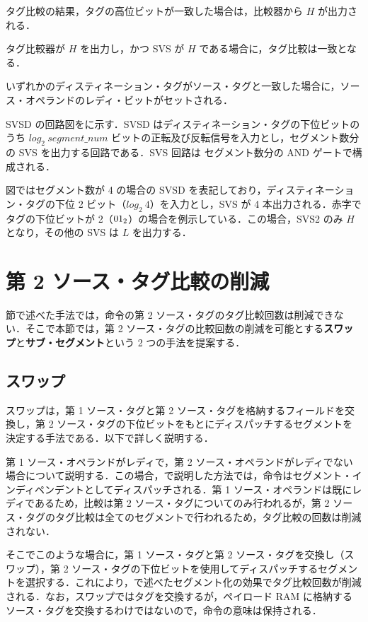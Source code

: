 タグ比較の結果，タグの高位ビットが一致した場合は，比較器から $H$ が出力される．

タグ比較器が $H$ を出力し，かつ SVS が $H$ である場合に，タグ比較は一致となる．

いずれかのディスティネーション・タグがソース・タグと一致した場合に，ソース・オペランドのレディ・ビットがセットされる．

SVSD の回路図をに示す．SVSD はディスティネーション・タグの下位ビットのうち $log_2\:segment\_num $ ビットの正転及び反転信号を入力とし，セグメント数分の SVS を出力する回路である．SVS 回路は セグメント数分の AND ゲートで構成される．

図ではセグメント数が 4 の場合の SVSD を表記しており，ディスティネーション・タグの下位 2 ビット（$log_2\:4$）を入力とし，SVS が 4 本出力される．赤字でタグの下位ビットが 2（${\rm 01_2}$）の場合を例示している．この場合，SVS2 のみ $H$ となり，その他の SVS は $L$ を出力する． 

\section{第 2 ソース・タグ比較の削減}
\label{sec:second_tag_comp}
節で述べた手法では，命令の第 2 ソース・タグのタグ比較回数は削減できない．そこで本節では，第 2 ソース・タグの比較回数の削減を可能とする\textbf{スワップ}と\textbf{サブ・セグメント}という 2 つの手法を提案する．

\subsection{スワップ}
\label{sec:swap}
スワップは，第 1 ソース・タグと第 2 ソース・タグを格納するフィールドを交換し，第 2 ソース・タグの下位ビットをもとにディスパッチするセグメントを決定する手法である．以下で詳しく説明する．

第 1 ソース・オペランドがレディで，第 2 ソース・オペランドがレディでない場合について説明する．この場合，で説明した方法では，命令はセグメント・インディペンデントとしてディスパッチされる．第 1 ソース・オペランドは既にレディであるため，比較は第 2 ソース・タグについてのみ行われるが，第 2  ソース・タグのタグ比較は全てのセグメントで行われるため，タグ比較の回数は削減されない．

そこでこのような場合に，第 1 ソース・タグと第 2 ソース・タグを交換し（スワップ），第 2 ソース・タグの下位ビットを使用してディスパッチするセグメントを選択する．これにより，で述べたセグメント化の効果でタグ比較回数が削減される．なお，スワップではタグを交換するが，ペイロード RAM に格納するソース・タグを交換するわけではないので，命令の意味は保持される．

